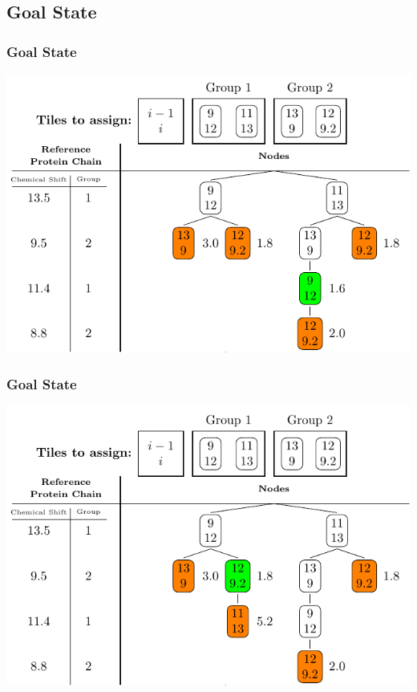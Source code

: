 \documentclass{beamer}
\begin{document}
\subsection{Goal State}
\begin{frame}
	\frametitle{Goal State}
	\vspace{-.5cm} 
	\center
	\includegraphics[width=.9\textwidth]{tilePlacement/step7}
\end{frame}

\begin{frame}
	\frametitle{Goal State}
	\vspace{-.5cm} 
	\center
	\includegraphics[width=.9\textwidth]{tilePlacement/step8}
\end{frame}
\end{document}
